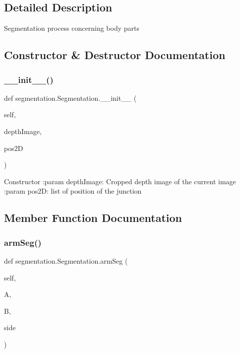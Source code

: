\subsection{Detailed Description}
\begin{DoxyVerb}Segmentation process concerning body parts
\end{DoxyVerb}
 

\subsection{Constructor \& Destructor Documentation}
\mbox{\label{classsegmentation_1_1_segmentation_a1a50054187dc1e2eebe8685fdd208bf6}} 
\subsubsection{\+\_\+\+\_\+init\+\_\+\+\_\+()}
{\footnotesize\ttfamily def segmentation.\+Segmentation.\+\_\+\+\_\+init\+\_\+\+\_\+ (\begin{DoxyParamCaption}\item[{}]{self,  }\item[{}]{depth\+Image,  }\item[{}]{pos2D }\end{DoxyParamCaption})}

\begin{DoxyVerb}Constructor
:param depthImage: Cropped depth image of the current image
:param pos2D: list of position of the junction
\end{DoxyVerb}
 

\subsection{Member Function Documentation}
\mbox{\label{classsegmentation_1_1_segmentation_acb6b057c22d3abbcc7de4e14453cfdc6}} 
\subsubsection{arm\+Seg()}
{\footnotesize\ttfamily def segmentation.\+Segmentation.\+arm\+Seg (\begin{DoxyParamCaption}\item[{}]{self,  }\item[{}]{A,  }\item[{}]{B,  }\item[{}]{side }\end{DoxyParamCaption})}

